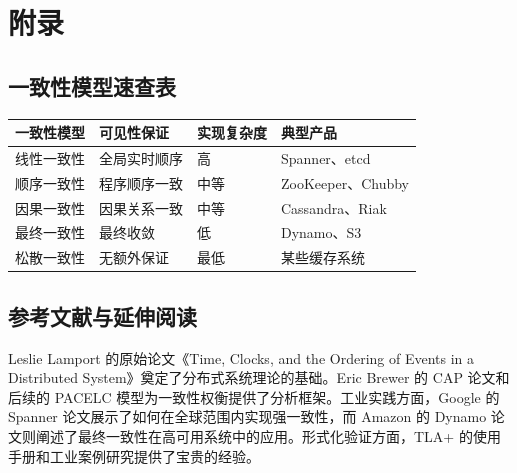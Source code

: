 \chapter{附录}
\section{一致性模型速查表}
\begin{table}[H]
\centering
\begin{tabular}{|l|l|l|l|}
\hline
一致性模型 & 可见性保证 & 实现复杂度 & 典型产品 \\
\hline
线性一致性 & 全局实时顺序 & 高 & Spanner、etcd \\
\hline
顺序一致性 & 程序顺序一致 & 中等 & ZooKeeper、Chubby \\
\hline
因果一致性 & 因果关系一致 & 中等 & Cassandra、Riak \\
\hline
最终一致性 & 最终收敛 & 低 & Dynamo、S3 \\
\hline
松散一致性 & 无额外保证 & 最低 & 某些缓存系统 \\
\hline
\end{tabular}
\end{table}
\section{参考文献与延伸阅读}
Leslie Lamport 的原始论文《Time, Clocks, and the Ordering of Events in a Distributed System》奠定了分布式系统理论的基础。Eric Brewer 的 CAP 论文和后续的 PACELC 模型为一致性权衡提供了分析框架。工业实践方面，Google 的 Spanner 论文展示了如何在全球范围内实现强一致性，而 Amazon 的 Dynamo 论文则阐述了最终一致性在高可用系统中的应用。形式化验证方面，TLA+ 的使用手册和工业案例研究提供了宝贵的经验。\par
